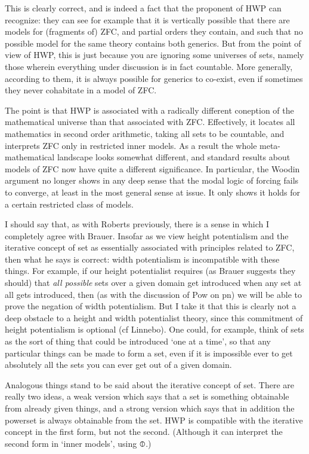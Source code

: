 \documentclass{article}
\begin{document}
This is clearly correct, and is indeed a fact that the proponent of HWP can 
recognize: they can see for example that it is vertically possible that there
are models for (fragments of) ZFC, and partial orders they contain, and such that no 
possible model for the same theory contains both generics. But from the point of 
view of HWP, this is just because you are ignoring some universes of sets, namely those 
wherein everything under discussion is in fact countable. More generally, according 
to them, it is always possible for generics to co-exist, even if 
sometimes they never cohabitate in a model of ZFC.

The point is that HWP is associated with a radically different coneption of 
the mathematical universe than that associated with ZFC. 
Effectively, it locates all mathematics in second order arithmetic,
taking all sets to be countable, and 
interprets ZFC only in restricted inner models. As a result the 
whole meta-mathematical landscape looks somewhat different, and standard 
results about models of ZFC now have quite a different significance. 
In particular,
the Woodin argument no longer shows in any deep sense that the modal logic 
of forcing fails to converge, at least in the most general sense at issue.
It only shows it holds for a certain restricted class of models.

I should say that, as with Roberts previously, there is a sense in which 
I completely agree with Brauer. Insofar as we view height potentialism 
and the iterative concept of set as essentially associated with principles related 
to ZFC, then what he says is correct: width potentialism is incompatible with these things.
For example, if our height potentialist requires (as Brauer suggests they should)
that \emph{all possible} sets over a given domain get introduced when any set 
at all gets introduced, then (as with the discussion of Pow on pn) we will 
be able to prove the negation of width potentialism. But I take it that this 
is clearly not a deep obstacle to a height and width potentialist theory, 
since this commitment of height potentialism is optional (cf Linnebo).
One could, for example, think of sets as the sort of thing that could be introduced 
`one at a time', so that 
any particular things can be  made to form a set, even if it is impossible ever 
to get absolutely all the sets you can ever get out of a given domain. 

Analogous things stand to be said about the iterative concept of set. There 
are really two ideas, a weak version which says that a set is something obtainable 
from already given things, and  a strong version which says that in addition 
the powerset is always obtainable from the set. HWP is compatible with the iterative concept 
in the first form, but not the second. (Although it can interpret the 
second form in `inner models', using $\circledbar$.)
\end{document}
